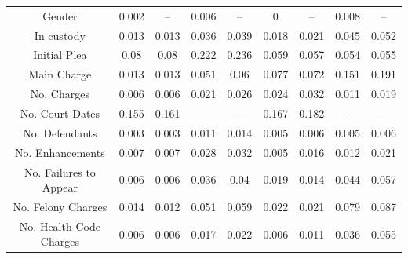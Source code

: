 \documentclass{AISB2008}
\begin{document}
\begin{table}[]
\begin{tabular}{@{}ccccc@{\qquad}cccc@{}}
Gender                    & 0.002                 & --                   & 0.006                & --                     & 0                     & --                   & 0.008                & --                   \\
In custody                & 0.013                 & 0.013                & 0.036                & 0.039                  & 0.018                 & 0.021                & 0.045                & 0.052                \\
Initial Plea              & 0.08                  & 0.08                 & 0.222                & 0.236                  & 0.059                 & 0.057                & 0.054                & 0.055                \\
Main Charge               & 0.013                 & 0.013                & 0.051                & 0.06                   & 0.077                 & 0.072                & 0.151                & 0.191                \\
No. Charges               & 0.006                 & 0.006                & 0.021                & 0.026                  & 0.024                 & 0.032                & 0.011                & 0.019                \\
No. Court Dates           & 0.155                 & 0.161                & --                   & --                     & 0.167                 & 0.182                & --                   & --                   \\
No. Defendants            & 0.003                 & 0.003                & 0.011                & 0.014                  & 0.005                 & 0.006                & 0.005                & 0.006                \\
No. Enhancements          & 0.007                 & 0.007                & 0.028                & 0.032                  & 0.005                 & 0.016                & 0.012                & 0.021                \\
No. Failures to Appear    & 0.006                 & 0.006                & 0.036                & 0.04                   & 0.019                 & 0.014                & 0.044                & 0.057                \\
No. Felony Charges        & 0.014                 & 0.012                & 0.051                & 0.059                  & 0.022                 & 0.021                & 0.079                & 0.087                \\
No. Health Code Charges   & 0.006                 & 0.006                & 0.017                & 0.022                  & 0.006                 & 0.011                & 0.036                & 0.055                \\

\end{tabular}
\end{table}
\end{document}
